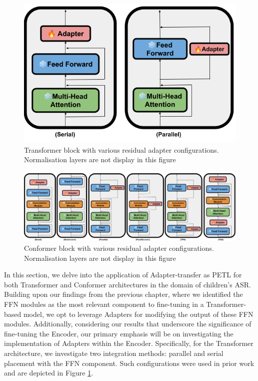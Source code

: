 \begin{figure}[t]
    \begin{center}
    \includegraphics[scale=0.27]{imgs/Adapter_Transformer.png}
    \caption{Transformer block with various residual adapter configurations. Normalisation layers are not display in this figure}
    \label{fig:transformer_config}
    \end{center}
\end{figure}
\begin{figure}[t]
    \begin{center}
    \includegraphics[scale=0.27]{imgs/Adapter_conformer.png}
    \caption{Conformer block with various residual adapter configurations. Normalisation layers are not display in this figure}
    \label{fig:conformer_config}
    \end{center}
\end{figure}

In this section, we delve into the application of Adapter-transfer as PETL for both Transformer and Conformer architectures in the domain of children's ASR. Building upon our findings from the previous chapter, where we identified the FFN modules as the most relevant component to fine-tuning in a Transformer-based model, we opt to leverage Adapters for modifying the output of these FFN modules. Additionally, considering our results that underscore the significance of fine-tuning the Encoder, our primary emphasis will be on investigating the implementation of Adapters within the Encoder. Specifically, for the Transformer architecture, we investigate two integration methods: parallel and serial placement with the FFN component. Such configurations were used in prior work \cite{he2022towards} and are depicted in Figure \ref{fig:transformer_config}.

